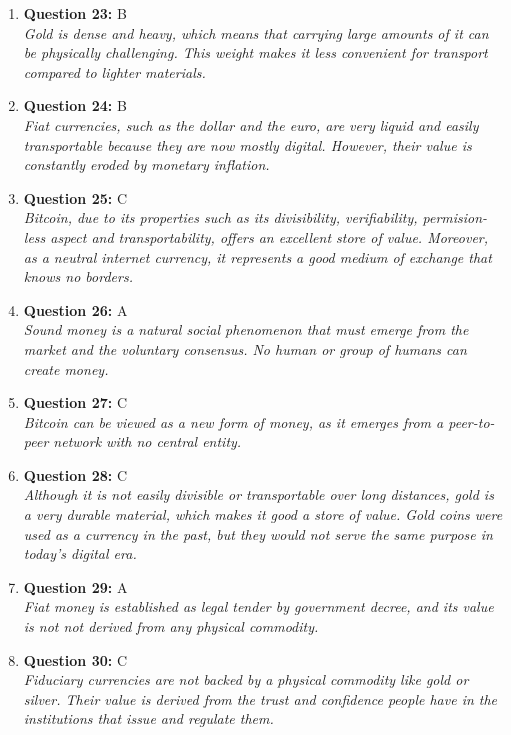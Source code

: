 \documentclass[12pt,a4paper]{article}
\begin{document}
\begin{enumerate}
\item \textbf{Question 23:} B
\\ \textit{Gold is dense and heavy, which means that carrying large amounts of it can be physically challenging. This weight makes it less convenient for transport compared to lighter materials.}

\item \textbf{Question 24:} B
\\ \textit{Fiat currencies, such as the dollar and the euro, are very liquid and easily transportable because they are now mostly digital. However, their value is constantly eroded by monetary inflation.}

\item \textbf{Question 25:} C
\\ \textit{Bitcoin, due to its properties such as its divisibility, verifiability, permision-less aspect and transportability, offers an excellent store of value. Moreover, as a neutral internet currency, it represents a good medium of exchange that knows no borders.}

\item \textbf{Question 26:} A
\\ \textit{Sound money is a natural social phenomenon that must emerge from the market and the voluntary consensus. No human or group of humans can create money.}

\item \textbf{Question 27:} C
\\ \textit{Bitcoin can be viewed as a new form of money, as it emerges from a peer-to-peer network with no central entity.}

\item \textbf{Question 28:} C
\\ \textit{Although it is not easily divisible or transportable over long distances, gold is a very durable material, which makes it good a store of value. Gold coins were used as a currency in the past, but they would not serve the same purpose in today's digital era.}

\item \textbf{Question 29:} A
\\ \textit{Fiat money is established as legal tender by government decree, and its value is not not derived from any physical commodity.}

\item \textbf{Question 30:} C
\\ \textit{Fiduciary currencies are not backed by a physical commodity like gold or silver. Their value is derived from the trust and confidence people have in the institutions that issue and regulate them.}


\end{enumerate}
\end{document}
